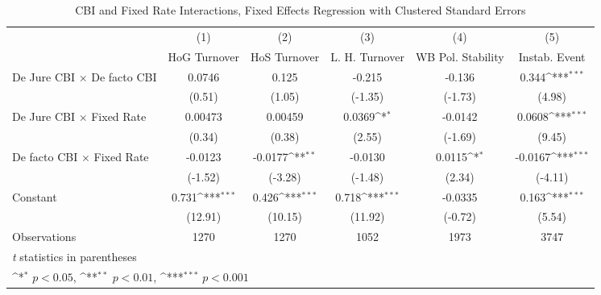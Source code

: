 \begin{table}[htbp]\centering
\def\sym#1{\ifmmode^{#1}\else\(^{#1}\)\fi}
\caption{CBI and Fixed Rate Interactions, Fixed Effects Regression with Clustered Standard Errors \label{imultIndFE}}
\begin{tabular}{l*{5}{c}}
\toprule
                                        &\multicolumn{1}{c}{(1)}&\multicolumn{1}{c}{(2)}&\multicolumn{1}{c}{(3)}&\multicolumn{1}{c}{(4)}&\multicolumn{1}{c}{(5)}\\
                                        &\multicolumn{1}{c}{HoG Turnover}&\multicolumn{1}{c}{HoS Turnover}&\multicolumn{1}{c}{L. H. Turnover}&\multicolumn{1}{c}{WB Pol. Stability}&\multicolumn{1}{c}{Instab. Event}\\
\midrule
De Jure CBI $\times$ De facto CBI       &   0.0746         &    0.125         &   -0.215         &   -0.136         &    0.344\sym{***}\\
                                        &   (0.51)         &   (1.05)         &  (-1.35)         &  (-1.73)         &   (4.98)         \\
\addlinespace
De Jure CBI $\times$ Fixed Rate         &  0.00473         &  0.00459         &   0.0369\sym{*}  &  -0.0142         &   0.0608\sym{***}\\
                                        &   (0.34)         &   (0.38)         &   (2.55)         &  (-1.69)         &   (9.45)         \\
\addlinespace
De facto CBI $\times$ Fixed Rate        &  -0.0123         &  -0.0177\sym{**} &  -0.0130         &   0.0115\sym{*}  &  -0.0167\sym{***}\\
                                        &  (-1.52)         &  (-3.28)         &  (-1.48)         &   (2.34)         &  (-4.11)         \\
\addlinespace
Constant                                &    0.731\sym{***}&    0.426\sym{***}&    0.718\sym{***}&  -0.0335         &    0.163\sym{***}\\
                                        &  (12.91)         &  (10.15)         &  (11.92)         &  (-0.72)         &   (5.54)         \\
\midrule
Observations                            &     1270         &     1270         &     1052         &     1973         &     3747         \\
\bottomrule
\multicolumn{6}{l}{\footnotesize \textit{t} statistics in parentheses}\\
\multicolumn{6}{l}{\footnotesize \sym{*} \(p<0.05\), \sym{**} \(p<0.01\), \sym{***} \(p<0.001\)}\\
\end{tabular}
\end{table}
